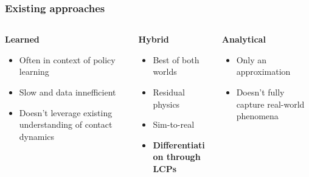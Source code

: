\documentclass{beamer}
\begin{document}
\begin{frame}
    \frametitle{Existing approaches}
    \begin{columns}[t]
        \begin{column}{0.33\textwidth}
            \textbf{Learned}
            \begin{itemize}
                \item Often in context of policy learning
                \item Slow and data innefficient
                \item Doesn't leverage existing understanding of contact dynamics
            \end{itemize}
        \end{column}

        \begin{column}{0.33\textwidth}
            \textbf{Hybrid}
            \begin{itemize}
                \item Best of both worlds
                \item Residual physics
                \item Sim-to-real
                \item \textbf{Differentiation through LCPs}
            \end{itemize}
        \end{column}

        \begin{column}{0.33\textwidth}
            \textbf{Analytical}
            \begin{itemize}
                \item Only an approximation
                \item Doesn't fully capture real-world phenomena
            \end{itemize}
        \end{column}

    \end{columns}
\end{frame}
\end{document}

